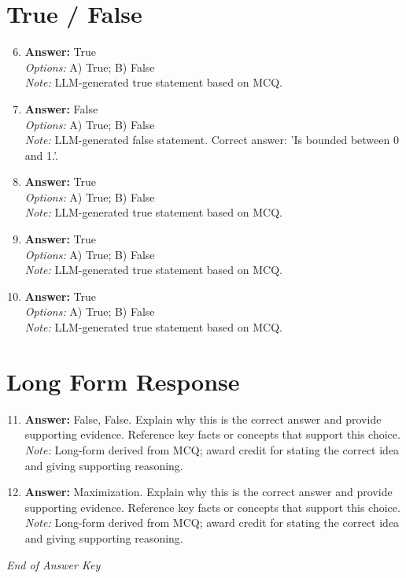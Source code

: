 \documentclass[12pt]{article}
\begin{document}
\section*{True / False}
\begin{enumerate}[label=\arabic*.]
\setcounter{enumi}{5}
\item \textbf{Answer:} True
\\ \textit{Options:} A) True; B) False
\\ \textit{Note:} LLM-generated true statement based on MCQ.
\item \textbf{Answer:} False
\\ \textit{Options:} A) True; B) False
\\ \textit{Note:} LLM-generated false statement. Correct answer: 'Is bounded between 0 and 1.'.
\item \textbf{Answer:} True
\\ \textit{Options:} A) True; B) False
\\ \textit{Note:} LLM-generated true statement based on MCQ.
\item \textbf{Answer:} True
\\ \textit{Options:} A) True; B) False
\\ \textit{Note:} LLM-generated true statement based on MCQ.
\item \textbf{Answer:} True
\\ \textit{Options:} A) True; B) False
\\ \textit{Note:} LLM-generated true statement based on MCQ.
\end{enumerate}

\section*{Long Form Response}
\begin{enumerate}[label=\arabic*.]
\setcounter{enumi}{10}
\item \textbf{Answer:} False, False. Explain why this is the correct answer and provide supporting evidence. Reference key facts or concepts that support this choice.
\\ \textit{Note:} Long-form derived from MCQ; award credit for stating the correct idea and giving supporting reasoning.
\item \textbf{Answer:} Maximization. Explain why this is the correct answer and provide supporting evidence. Reference key facts or concepts that support this choice.
\\ \textit{Note:} Long-form derived from MCQ; award credit for stating the correct idea and giving supporting reasoning.
\end{enumerate}

\vfill
\noindent\textit{End of Answer Key}
\end{document}
